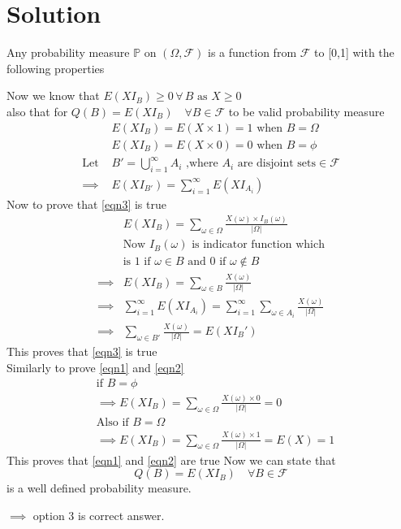 \documentclass[journal,12pt,twocolumn]{IEEEtran}
\begin{document}
\section{Solution}
Any probability measure \(\mathbb{P}\) on \((\Omega,\mathcal{F})\) is a function from \(\mathcal{F}\) to [0,1] with the following properties
Now we know that \(E(XI_B)\geq 0\, \forall\, B\text{ as } X\geq 0\)\\
also that for \(Q(B) =E(XI_B)\quad  \forall B \in \mathcal{F}\) to be valid probability measure
\begin{align}
& E(XI_B)=E(X\times 1)=1  \text{ when } B=\Omega \label{eqn1}\\ 
& E(XI_B)=E(X\times0)=0  \text{ when } B=\phi  \label{eqn2} \\ \nonumber
 \text{Let } &B'=\bigcup_{i=1}^{\infty} A_i \text{ ,where } A_i\text{ are disjoint sets}\in \mathcal{F}\\ 
\implies & E(XI_{B'})=\sum_{i=1}^{\infty} E(XI_{A_i}) \label{eqn3}
\end{align}
Now to prove that \eqref{eqn3} is true
\begin{align}
& E(XI_B)=\sum_{\omega \in \Omega}\frac{ X(\omega)\times I_B(\omega)}{|\Omega|}\\ \nonumber
&\text{Now \(I_B(\omega)\) is indicator function which}\\
&\text{is 1 if }\omega \in B \text{ and 0 if } \omega \notin  B\\
\implies & E(XI_B)=\sum_{\omega \in B} \frac{X(\omega)}{|\Omega|}\\
\implies & \sum_{i=1}^{\infty} E(XI_{A_i})=\sum_{i=1}^{\infty} \sum_{\omega \in A_i}\frac{X(\omega)}{|\Omega|}\\
\implies & \sum_{\omega \in B'}\frac{X(\omega)}{|\Omega|}=E(XI_B')
\end{align} 
This proves that \eqref{eqn3} is true\\
Similarly to prove \eqref{eqn1} and \eqref{eqn2}
\begin{align} \nonumber
&\text{if }B =\phi \\
&\implies E(XI_B)=\sum_{\omega \in \Omega}\frac{ X(\omega)\times 0}{|\Omega|}=0\\ \nonumber
&\text{Also if }B=\Omega\\
&\implies E(XI_B)=\sum_{\omega \in \Omega}\frac{ X(\omega)\times 1}{|\Omega|}=E(X)=1
\end{align}
This proves that \eqref{eqn1} and \eqref{eqn2} are true 
Now we can state that \[Q(B)=E(XI_B)\quad\forall B \in \mathcal{F}\] is a well defined probability measure.

\(\implies\) option 3 is correct answer.
\end{document}
